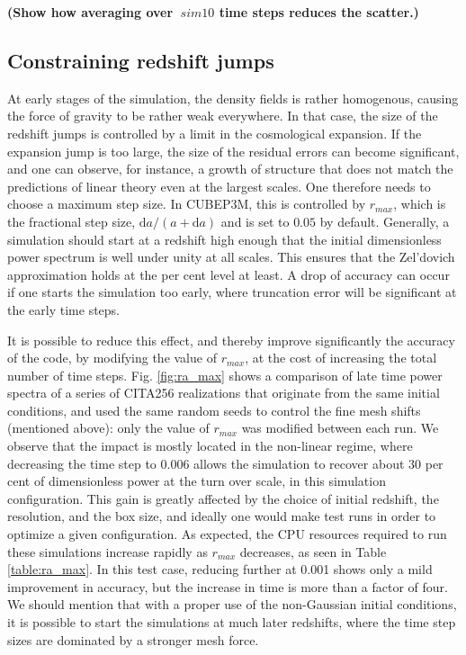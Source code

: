 {\bf (Show how averaging over $~sim10$ time steps reduces the scatter.)}


\subsection{Constraining redshift jumps}

At early stages of the simulation, the density fields is rather homogenous, causing the force of gravity to be
rather weak everywhere. In that case, the size of the redshift jumps is controlled by a limit in the cosmological expansion.
If the expansion jump is too large, the size of the residual errors can become significant, and one can observe, for instance,
a growth of structure that does not match the predictions of  linear theory even at the largest scales.
One therefore needs to choose a maximum step size. In {\small CUBEP3M}, this is controlled by $r_{max}$, which is the fractional step size,
$\mbox{d}a/(a + \mbox{d}a)$ and is set to $0.05$ by default.  Generally, a simulation should start at a redshift high enough that
the initial dimensionless power spectrum is well under unity at all scales. This ensures that the Zel'dovich approximation
 holds at the per cent level at least. A drop of accuracy can occur if one starts the simulation too early, where
 truncation error will be significant at the early time steps.


It is possible to reduce this effect, and thereby improve significantly 
the accuracy of the code, by modifying the value of $r_{max}$, at the cost of increasing the total number of time steps.
Fig. \ref{fig:ra_max} shows a comparison of late time power spectra of a series of CITA256 realizations that originate from the same initial conditions, 
and used the same random seeds to control the fine mesh shifts (mentioned above): only the value of $r_{max}$ was modified between each run. 
We observe that the impact is mostly located in the non-linear regime, where decreasing the time step to 0.006 
allows the simulation to recover about 30 per cent of dimensionless power at the turn over scale, in this simulation configuration.
This gain is greatly affected by the choice of initial redshift, the resolution, and the box size, and ideally one would make
test runs in order to optimize a given configuration.  
As expected, the {\small CPU} resources required to run these simulations increase rapidly as $r_{max}$ decreases, as seen in Table \ref{table:ra_max}. 
In this test case, reducing further at 0.001 shows only a mild improvement in accuracy, but the increase in time is more than a factor of four.
We should mention that with a proper use of the non-Gaussian initial conditions, it is possible to start the simulations at much later redshifts, where the time step sizes are dominated by a stronger mesh force.
 

